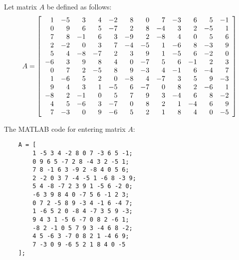 \documentclass{ximera}
\author{Zack Reed}
\begin{document}
\begin{exercise}
    
    Let matrix \( A \) be defined as follows:
    \[
    A = \startmat{rrrrrrrrrrrr}
        1 & -5 & 3 & 4 & -2 & 8 & 0 & 7 & -3 & 6 & 5 & -1 \\
        0 & 9 & 6 & 5 & -7 & 2 & 8 & -4 & 3 & 2 & -5 & 1 \\
        7 & 8 & -1 & 6 & 3 & -9 & 2 & -8 & 4 & 0 & 5 & 6 \\
        2 & -2 & 0 & 3 & 7 & -4 & -5 & 1 & -6 & 8 & -3 & 9 \\
        5 & 4 & -8 & -7 & 2 & 3 & 9 & 1 & -5 & 6 & -2 & 0 \\
        -6 & 3 & 9 & 8 & 4 & 0 & -7 & 5 & 6 & -1 & 2 & 3 \\
        0 & 7 & 2 & -5 & 8 & 9 & -3 & 4 & -1 & 6 & -4 & 7 \\
        1 & -6 & 5 & 2 & 0 & -8 & 4 & -7 & 3 & 5 & 9 & -3 \\
        9 & 4 & 3 & 1 & -5 & 6 & -7 & 0 & 8 & 2 & -6 & 1 \\
        -8 & 2 & -1 & 0 & 5 & 7 & 9 & 3 & -4 & 6 & 8 & -2 \\
        4 & 5 & -6 & 3 & -7 & 0 & 8 & 2 & 1 & -4 & 6 & 9 \\
        7 & -3 & 0 & 9 & -6 & 5 & 2 & 1 & 8 & 4 & 0 & -5
    \stopmat
    \]
    
    \begin{hint}
    The MATLAB code for entering matrix \( A \):
    \begin{verbatim}
    A = [
        1 -5 3 4 -2 8 0 7 -3 6 5 -1;
        0 9 6 5 -7 2 8 -4 3 2 -5 1;
        7 8 -1 6 3 -9 2 -8 4 0 5 6;
        2 -2 0 3 7 -4 -5 1 -6 8 -3 9;
        5 4 -8 -7 2 3 9 1 -5 6 -2 0;
        -6 3 9 8 4 0 -7 5 6 -1 2 3;
        0 7 2 -5 8 9 -3 4 -1 6 -4 7;
        1 -6 5 2 0 -8 4 -7 3 5 9 -3;
        9 4 3 1 -5 6 -7 0 8 2 -6 1;
        -8 2 -1 0 5 7 9 3 -4 6 8 -2;
        4 5 -6 3 -7 0 8 2 1 -4 6 9;
        7 -3 0 9 -6 5 2 1 8 4 0 -5
    ];
    \end{verbatim}

    \end{hint}
    

\end{exercise}
\end{document}
